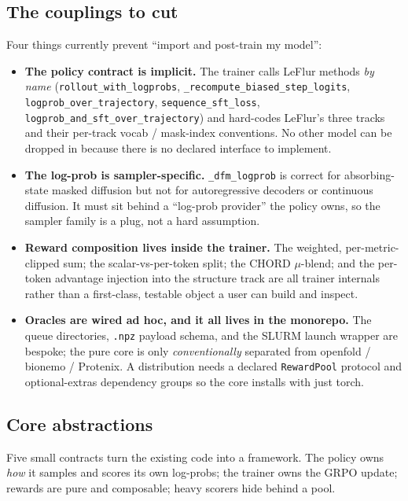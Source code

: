 \documentclass[11pt]{article}
\newcommand{\ttk}[1]{\texttt{\small #1}}
\begin{document}
\subsection{The couplings to cut}
Four things currently prevent ``import and post-train my model'':
\begin{itemize}
\item \textbf{The policy contract is implicit.} The trainer calls LeFlur methods \emph{by name}
  (\ttk{rollout\_with\_logprobs}, \ttk{\_recompute\_biased\_step\_logits},
  \ttk{logprob\_over\_trajectory}, \ttk{sequence\_sft\_loss},
  \ttk{logprob\_and\_sft\_over\_trajectory}) and hard-codes LeFlur's three tracks and their
  per-track vocab / mask-index conventions. No other model can be dropped in because there is no
  declared interface to implement.
\item \textbf{The log-prob is sampler-specific.} \ttk{\_dfm\_logprob} is correct for
  absorbing-state masked diffusion but not for autoregressive decoders or continuous diffusion. It
  must sit behind a ``log-prob provider'' the policy owns, so the sampler family is a plug, not a
  hard assumption.
\item \textbf{Reward composition lives inside the trainer.} The weighted, per-metric-clipped sum;
  the scalar-vs-per-token split; the CHORD $\mu$-blend; and the per-token advantage injection into
  the structure track are all trainer internals rather than a first-class, testable object a user
  can build and inspect.
\item \textbf{Oracles are wired ad hoc, and it all lives in the monorepo.} The queue directories,
  \ttk{.npz} payload schema, and the SLURM launch wrapper are bespoke; the pure core is only
  \emph{conventionally} separated from openfold / bionemo / Protenix. A distribution needs a
  declared \ttk{RewardPool} protocol and optional-extras dependency groups so the core installs with
  just torch.
\end{itemize}

\subsection{Core abstractions}
Five small contracts turn the existing code into a framework. The policy owns \emph{how} it samples
and scores its own log-probs; the trainer owns the GRPO update; rewards are pure and composable;
heavy scorers hide behind a pool.
\end{document}
